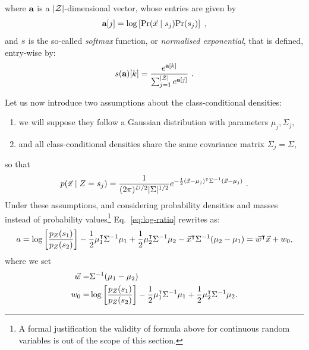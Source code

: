 where $\textbf{a}$ is a $\lvert\mathcal{Z}\rvert$-dimensional vector, whose entries are given by
\begin{equation}\label{eq:softmax_entries}
\aaa[j] = \log\left[ \prob(\given{\vLeakVec}{\sensVarValue{j}})\prob(\sensVarValue{j}) \right] \mbox{ ,}
\end{equation}
and $s$ is the so-called \emph{softmax} function, or \emph{normalised exponential}, that is defined, entry-wise by:
\begin{equation}\label{eq:softmax}
s(\textbf{a})[k] = \frac{e^{\textbf{a}[k]}}{\sum_{j=1}^{\lvert\mathcal{Z}\rvert}e^{\textbf{a}[j]}}\mbox{ .}
\end{equation}

Let us now introduce two assumptions about the class-conditional densities:
\begin{enumerate}[label=(\roman*)]
\item \label{item:gaussian} we will suppose they follow a Gaussian distribution with parameters $\mu_j, \Sigma_j$,
\item \label{item:covariances} and all class-conditional densities share the same covariance matrix $\Sigma_j=\Sigma$,
\end{enumerate}
so that
\begin{equation}
\pdf(\given{\vLeakVec}{\sensRandVar = \sensVarValue{j}}) = \frac{1}{(2\pi)^{{\traceLength}/2}\lvert \Sigma\rvert^{1/2}}e^{-\frac{1}{2}(\vLeakVec- \mu_j)^\intercal\Sigma^{-1}(\vLeakVec- \mu_j)} \mbox{ .}
\end{equation}
Under these assumptions, and considering probability densities and masses instead of probability values\footnote{A formal justification the validity of formula above for continuous random variables is out of the scope of this section.} Eq.~\eqref{eq:log-ratio} rewrites as: 
\begin{equation}\label{eq:LDA-2classes}
a = \log\left[\frac{p_{Z}(s_{1})}{p_{Z}(s_{2})}\right] - \frac{1}{2}\mu_1^\intercal\Sigma^{-1}\mu_1 + \frac{1}{2}\mu_2^\intercal\Sigma^{-1}\mu_2 - \vec{x}^\intercal\Sigma^{-1}(\mu_2-\mu_1) = \vec{w}^\intercal \vec{x} + w_0, 
\end{equation}
where we set 
\begin{align*}
\vec{w} =& \Sigma^{-1}(\mu_1-\mu_2)\\
w_0 =  & \log\left[\frac{p_{Z}(s_{1})}{p_{Z}(s_{2})}\right] - \frac{1}{2}\mu_1^\intercal\Sigma^{-1}\mu_1 + \frac{1}{2}\mu_2^\intercal\Sigma^{-1}\mu_2 . 
\end{align*}
